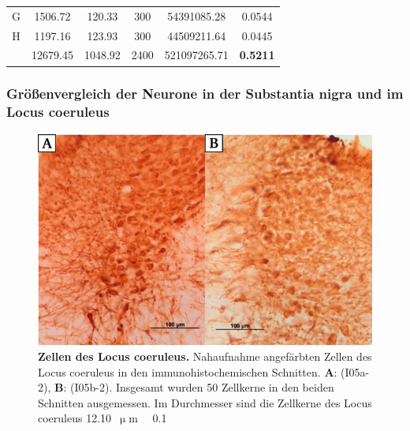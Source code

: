\documentclass[12pt,a4paper,pdftex]{article}
\newcommand{\rpm}{\raisebox{.2ex}{$\scriptstyle\pm$} }
\begin{document}
\begin{table}[H]
{\begin{tabular}{cccccc}
G                                 & 1506.72                                 & 120.33                                   & 300                                    & 54391085.28                                & 0.0544                                     \\
H                                 & 1197.16                                 & 123.93                                   & 300                                    & 44509211.64                                & 0.0445                                     \\\hline
                                  & 12679.45                                & 1048.92                                  & 2400                                   & 521097265.71                               & \textbf{0.5211}                           
\end{tabular}%
}
\end{table}


\subsubsection{Größenvergleich der Neurone in der Substantia nigra und im Locus coeruleus}

\begin{figure}[H]
    \centering
    \includegraphics{pictures/Bilder_monoamine_systeme/Zellen_LC.png}
    \caption[Zellen des Locus coeruleus]{\textbf{Zellen des Locus coeruleus.} Nahaufnahme angefärbten Zellen des Locus coeruleus in den immunohistochemischen Schnitten. \textbf{A}: (I05a-2), \textbf{B}: (I05b-2). Insgesamt wurden 50 Zellkerne in den beiden Schnitten ausgemessen. Im Durchmesser sind die Zellkerne des Locus coeruleus 12.10~$\upmu$m~\rpm~0.1}
    \label{fig:Zellen_LC}
\end{figure}
\end{document}

